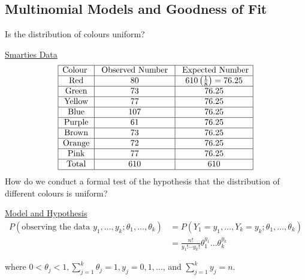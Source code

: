 \subsection{Multinomial Models and Goodness of Fit}
Is the distribution of colours uniform?

\underline{Smarties Data}
\[ \begin{array}{|c|c|c|}
        \hline
        \text{Colour } & \text{ Observed Number } & \text{ Expected Number}           \\
        \hline
        \text{Red}     & 80                       & 610\left(\frac{1}{8}\right)=76.25 \\
        \hline
        \text{Green}   & 73                       & 76.25                             \\
        \hline
        \text{Yellow}  & 77                       & 76.25                             \\
        \hline
        \text{Blue}    & 107                      & 76.25                             \\
        \hline
        \text{Purple}  & 61                       & 76.25                             \\
        \hline
        \text{Brown}   & 73                       & 76.25                             \\
        \hline
        \text{Orange}  & 72                       & 76.25                             \\
        \hline
        \text{Pink}    & 77                       & 76.25                             \\
        \hline
        \text{Total}   & 610                      & 610                               \\
        \hline
    \end{array} \]
How do we conduct a formal test of the hypothesis that the distribution of different
colours is uniform?

\underline{Model and Hypothesis}
\begin{align*}
    P\left(\text{observing the data } y_{1}, \ldots, y_{k} ; \theta_{1}, \ldots, \theta_{k}\right)
     & =P\left(Y_{1}=y_{1}, \ldots, Y_{k}=y_{k} ; \theta_{1}, \ldots, \theta_{k}\right) \\
     & =\frac{n !}{y_{1} ! \cdots y_{k} !} \theta_{1}^{y_{1}} \dots \theta_{k}^{y_{k}}
\end{align*}

where $0<\theta_{j}<1, \sum_{j=1}^{k} \theta_{j}=1, y_{j}=0,1, \ldots$, and $\sum_{j=1}^{k} y_{j}=n$.

